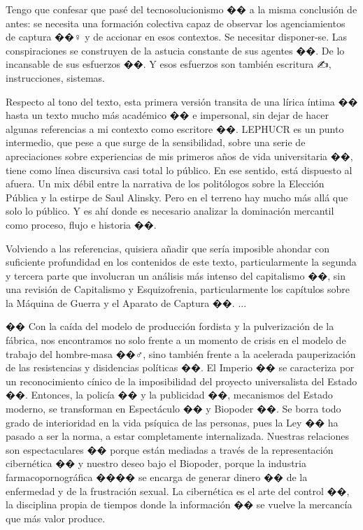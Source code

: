 Tengo que confesar que pasé del tecnosolucionismo �� a la misma conclusión de antes: se necesita una formación colectiva capaz de observar los agenciamientos de captura ��️‍♀️ y de accionar en esos contextos. Se necesitar disponer-se. Las conspiraciones se construyen de la astucia constante de sus agentes ��. De lo incansable de sus esfuerzos ��. Y esos esfuerzos son también escritura ✍️, instrucciones, sistemas.

Respecto al tono del texto, esta primera versión transita de una lírica íntima �� hasta un texto mucho más académico �� e impersonal, sin dejar de hacer algunas referencias a mi contexto como escritore ��. LEPHUCR es un punto intermedio, que pese a que surge de la sensibilidad, sobre una serie de apreciaciones sobre experiencias de mis primeros años de vida universitaria ��, tiene como línea discursiva casi total lo público. En ese sentido, está dispuesto al afuera. Un mix débil entre la narrativa de los politólogos sobre la Elección Pública y la estirpe de Saul Alinsky. Pero en el terreno hay mucho más allá que solo lo público. Y es ahí donde es necesario analizar la dominación mercantil como proceso, flujo e historia ��.

Volviendo a las referencias, quisiera añadir que sería imposible ahondar con suficiente profundidad en los contenidos de este texto, particularmente la segunda y tercera parte que involucran un análisis más intenso del capitalismo ��, sin una revisión de Capitalismo y Esquizofrenia, particularmente los capítulos sobre la Máquina de Guerra y el Aparato de Captura ��.
...

�� Con la caída del modelo de producción fordista y la pulverización de la fábrica, nos encontramos no solo frente a un momento de crisis en el modelo de trabajo del hombre-masa ��‍♂️, sino también frente a la acelerada pauperización de las resistencias y disidencias políticas ��. El Imperio �� se caracteriza por un reconocimiento cínico de la imposibilidad del proyecto universalista del Estado ��️. Entonces, la policía �� y la publicidad ��, mecanismos del Estado moderno, se transforman en Espectáculo �� y Biopoder ��. Se borra todo grado de interioridad en la vida psíquica de las personas, pues la Ley �� ha pasado a ser la norma, a estar completamente internalizada. Nuestras relaciones son espectaculares �� porque están mediadas a través de la representación cibernética �� y nuestro deseo bajo el Biopoder, porque la industria farmacopornográfica ���� se encarga de generar dinero �� de la enfermedad y de la frustración sexual. La cibernética es el arte del control ��, la disciplina propia de tiempos donde la información �� se vuelve la mercancía que más valor produce.

